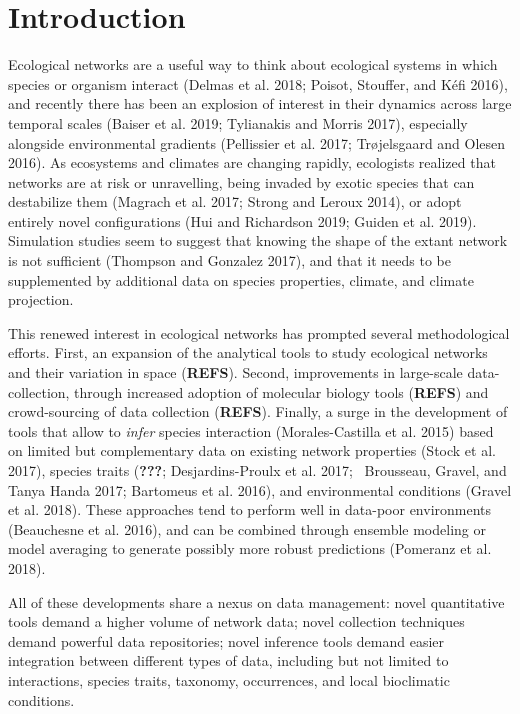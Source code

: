 \hypertarget{introduction}{%
\section{Introduction}\label{introduction}}

Ecological networks are a useful way to think about ecological systems
in which species or organism interact (Delmas et al. 2018; Poisot,
Stouffer, and Kéfi 2016), and recently there has been an explosion of
interest in their dynamics across large temporal scales (Baiser et al.
2019; Tylianakis and Morris 2017), especially alongside environmental
gradients (Pellissier et al. 2017; Trøjelsgaard and Olesen 2016). As
ecosystems and climates are changing rapidly, ecologists realized that
networks are at risk or unravelling, being invaded by exotic species
that can destabilize them (Magrach et al. 2017; Strong and Leroux 2014),
or adopt entirely novel configurations (Hui and Richardson 2019; Guiden
et al. 2019). Simulation studies seem to suggest that knowing the shape
of the extant network is not sufficient (Thompson and Gonzalez 2017),
and that it needs to be supplemented by additional data on species
properties, climate, and climate projection.

This renewed interest in ecological networks has prompted several
methodological efforts. First, an expansion of the analytical tools to
study ecological networks and their variation in space (\textbf{REFS}).
Second, improvements in large-scale data-collection, through increased
adoption of molecular biology tools (\textbf{REFS}) and crowd-sourcing
of data collection (\textbf{REFS}). Finally, a surge in the development
of tools that allow to \emph{infer} species interaction
(Morales-Castilla et al. 2015) based on limited but complementary data
on existing network properties (Stock et al. 2017), species traits
({\textbf{???}}; Desjardins-Proulx et al. 2017; ~Brousseau, Gravel, and
Tanya Handa 2017; Bartomeus et al. 2016), and environmental conditions
(Gravel et al. 2018). These approaches tend to perform well in data-poor
environments (Beauchesne et al. 2016), and can be combined through
ensemble modeling or model averaging to generate possibly more robust
predictions (Pomeranz et al. 2018).

All of these developments share a nexus on data management: novel
quantitative tools demand a higher volume of network data; novel
collection techniques demand powerful data repositories; novel inference
tools demand easier integration between different types of data,
including but not limited to interactions, species traits, taxonomy,
occurrences, and local bioclimatic conditions.

